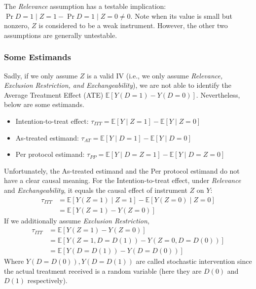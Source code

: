 The \textit{Relevance} assumption has a testable implication: \(\Pr{D = 1 \mid Z = 1} - \Pr{D = 1 \mid Z = 0} \neq 0\). Note when its value is small but nonzero, \(Z\) is considered to be a weak instrument. However, the other two assumptions are generally untestable.

\subsubsection{Some Estimands}
Sadly, if we only assume \(Z\) is a valid IV (i.e., we only assume \textit{Relevance, Exclusion Restriction, and Exchangeability}), we are not able to identify the Average Treatment Effect (ATE) \(\mathbb{E}[Y(D = 1) - Y(D = 0)]\). Nevertheless, below are some estimands.
\begin{itemize}
    \item Intention-to-treat effect: \(\tau_{ITT} = \mathbb{E}[Y \mid Z = 1] - \mathbb{E}[Y \mid Z = 0]\)
    \item As-treated estimand: \(\tau_{AT} = \mathbb{E}[Y \mid D = 1] - \mathbb{E}[Y \mid D = 0]\)
    \item Per protocol estimand: \(\tau_{PP} = \mathbb{E}[Y \mid D = Z = 1] - \mathbb{E}[Y \mid D = Z = 0]\)
\end{itemize}
Unfortunately, the As-treated estimand and the Per protocol estimand do not have a clear causal meaning. For the Intention-to-treat effect, under \textit{Relevance} and \textit{Exchangeability}, it equals the causal effect of instrument \(Z\) on \(Y\): 
\begin{align*}
    \tau_{ITT} &= \mathbb{E}[Y(Z = 1) \mid Z = 1] - \mathbb{E}[Y(Z = 0) \mid Z = 0] \\
    &= \mathbb{E}[Y(Z = 1) - Y(Z = 0)]
\end{align*}
If we additionally assume \textit{Exclusion Restriction}, 
\begin{align*}
    \tau_{ITT} &= \mathbb{E}[Y(Z = 1) - Y(Z = 0)] \\
    &= \mathbb{E}[Y(Z = 1, D = D(1)) - Y(Z = 0, D = D(0))] \\
    &= \mathbb{E}[Y(D = D(1)) - Y(D = D(0))]
\end{align*}
Where \(Y(D = D(0)), Y(D = D(1))\) are called stochastic intervention since the actual treatment received is a random variable (here they are \(D(0)\) and \(D(1)\) respectively). 

